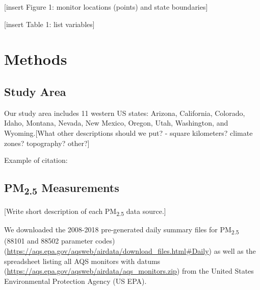 \documentclass[english]{article}
\begin{document}
[insert Figure 1:  monitor locations (points) and state boundaries]

[insert Table 1: list variables]


\section*{Methods}


\subsection*{Study Area}

Our study area includes 11 western US states: Arizona, California, Colorado, Idaho, Montana, Nevada, New Mexico, Oregon, Utah, Washington, and Wyoming.[What other descriptions should we put? - square kilometers? climate zones? topography? other?] 

Example of citation: \cite{liu_estimating_2005}

\subsection*{PM\textsubscript{2.5} Measurements}

[Write short description of each PM\textsubscript{2.5} data source.]

We downloaded the 2008-2018 pre-generated daily summary files for PM\textsubscript{2.5} (88101 and 88502 parameter codes)  (\url{https://aqs.epa.gov/aqsweb/airdata/download_files.html#Daily}) as well as the spreadsheet listing all AQS monitors with datums (\url{https://aqs.epa.gov/aqsweb/airdata/aqs_monitors.zip}) 
from the United States Environmental Protection Agency (US EPA).
\end{document}
